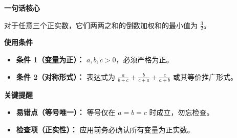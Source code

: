 \begin{summarybox}
\textbf{\textcolor{CSummary}{一句话核心}}

对于任意三个正实数，它们两两之和的倒数加权和的最小值为 $\frac{3}{2}$。

\medskip
\textbf{\textcolor{CSummary}{使用条件}}
\begin{itemize}[leftmargin=*, itemsep=0.5em, topsep=0.4em]
    \item \textbf{条件 1（变量为正）：} $a,b,c > 0$，必须严格为正。
    \item \textbf{条件 2（对称形式）：} 表达式为 $\frac{a}{b+c} + \frac{b}{c+a} + \frac{c}{a+b}$ 或其等价推广形式。
\end{itemize}

\medskip
\textbf{\textcolor{CSummary}{关键提醒}}
\begin{itemize}[leftmargin=*, itemsep=0.5em, topsep=0.4em]
    \item \textbf{易错点（等号唯一）：} 等号仅在 $a=b=c$ 时成立，勿忘检查。
    \item \textbf{检查项（正实性）：} 应用前务必确认所有变量为正实数。
\end{itemize}
\end{summarybox}
